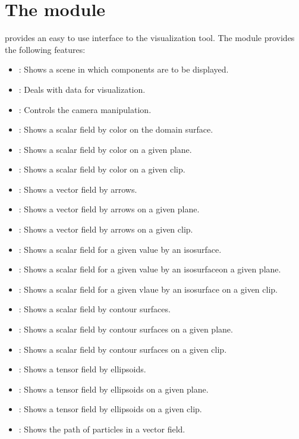\chapter{The module \pyvisi}
\label{PYVISI CHAP}


\pyvisi provides an easy to use interface to the \VTK visualization 
tool. The module provides the following features:

\begin{itemize}
\item \Scene: Shows a scene in which components are to be displayed.
\item \DataCollector: Deals with data for visualization.
\item \Camera: Controls the camera manipulation. 
\item \Map: Shows a scalar field by color on the domain surface.
\item \MapOnPlane: Shows a scalar field by color on a given plane. 
\item \MapOnClip: Shows a scalar field by color on a given clip.
\item \Arrows: Shows a vector field by arrows.
\item \ArrowsOnPlane: Shows a vector field by arrows on a given plane.
\item \ArrowsOnClip: Shows a vector field by arrows on a given clip.
\item \IsoSurface: Shows a scalar field for a given value by 
an isosurface.
\item \IsoSurfaceOnPlane: Shows a scalar field for a given value by 
an isosurfaceon a given plane.
\item \IsoSurfaceOnClip: Shows a scalar field for a given vlaue by 
an isosurface on a given clip.
\item \Contour: Shows a scalar field by contour surfaces. 
\item \ContourOnPlane: Shows a scalar field by contour surfaces on 
a given plane.
\item \ContourOnClip: Shows a scalar field by contour surfaces on 
a given clip.
\item \TensorC: Shows a tensor field by ellipsoids.
\item \TensorOnPlane: Shows a tensor field by ellipsoids on 
a given plane.
\item \TensorOnClip: Shows a tensor field by ellipsoids on a given clip.
\item \StreamLines: Shows the path of particles in a vector field.

\end{itemize}
